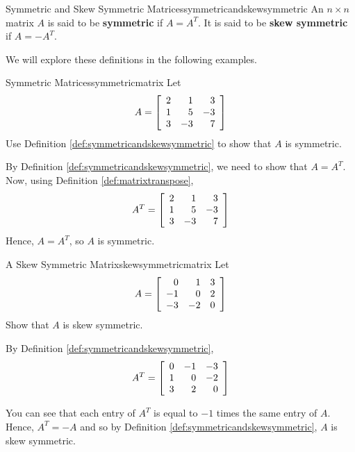 \begin{definition}{Symmetric and Skew Symmetric Matrices}{symmetricandskewsymmetric}
An $n\times n$ matrix $A$ is said to be
\textbf{symmetric} if $A=A^{T}.$ It is said to be
\textbf{skew symmetric} if $A=-A^{T}.$
\end{definition}

We will explore these definitions in the following examples.

\begin{example}{Symmetric Matrices}{symmetricmatrix}
Let
\begin{equation*}
A=\left[
\begin{array}{rrr}
2 & 1 & 3 \\
1 & 5 & -3 \\
3 & -3 & 7
\end{array}
\right] 
\end{equation*}
Use Definition \ref{def:symmetricandskewsymmetric} to show that $A$ is symmetric. 
\end{example}

\begin{solution}
By Definition \ref{def:symmetricandskewsymmetric}, we need to show that $A = A^T$. 
Now, using Definition \ref{def:matrixtranspose}, 
\begin{equation*}
A^{T} = \left[
\begin{array}{rrr}
2 & 1 & 3 \\
1 & 5 & -3 \\
3 & -3 & 7
\end{array}
\right]
\end{equation*}
Hence, $A = A^{T}$, so $A$ is symmetric.
\end{solution}

\begin{example}{A Skew Symmetric Matrix}{skewsymmetricmatrix}
Let
\begin{equation*}
A=\left[
\begin{array}{rrr}
0 & 1 & 3 \\
-1 & 0 & 2 \\
-3 & -2 & 0
\end{array}
\right] 
\end{equation*}
Show that $A$ is skew symmetric.
\end{example}

\begin{solution} By Definition \ref{def:symmetricandskewsymmetric}, 
\begin{equation*}
A^{T} = \left[
\begin{array}{rrr}
0 & -1 & -3\\
1 &  0 & -2\\
3 &  2 &  0
\end{array}
\right] 
\end{equation*}

You can see that each entry of $A^T$ is equal to $-1$ times the same entry of $A$. 
Hence, $A^{T} = - A$ and so by Definition \ref{def:symmetricandskewsymmetric}, $A$ is skew symmetric. 
\end{solution}
